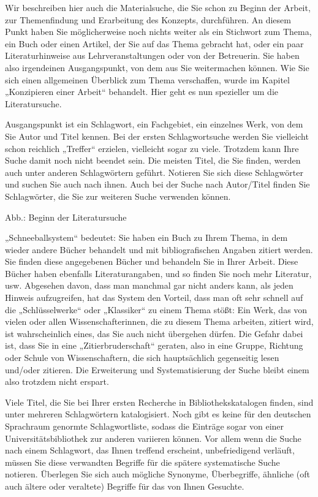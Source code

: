 \documentclass[]{book}
\theoremstyle{definition}
\theoremstyle{definition}
\theoremstyle{definition}
\theoremstyle{remark}
\begin{document}
Wir beschreiben hier auch die Materialsuche, die Sie schon zu Beginn der
Arbeit, zur Themenfindung und Erarbeitung des Konzepts, durchführen. An
diesem Punkt haben Sie möglicherweise noch nichts weiter als ein
Stichwort zum Thema, ein Buch oder einen Artikel, der Sie auf das Thema
gebracht hat, oder ein paar Literaturhinweise aus Lehrveranstaltungen
oder von der Betreuerin. Sie haben also irgendeinen Ausgangspunkt, von
dem aus Sie weitermachen können. Wie Sie sich einen allgemeinen
Überblick zum Thema verschaffen, wurde im Kapitel „Konzipieren einer
Arbeit`` behandelt. Hier geht es nun spezieller um die Literatursuche.

Ausgangspunkt ist ein Schlagwort, ein Fachgebiet, ein einzelnes Werk,
von dem Sie Autor und Titel kennen. Bei der ersten Schlagwortsuche
werden Sie vielleicht schon reichlich „Treffer`` erzielen, vielleicht
sogar zu viele. Trotzdem kann Ihre Suche damit noch nicht beendet sein.
Die meisten Titel, die Sie finden, werden auch unter anderen
Schlagwörtern geführt. Notieren Sie sich diese Schlagwörter und suchen
Sie auch nach ihnen. Auch bei der Suche nach Autor/Titel finden Sie
Schlagwörter, die Sie zur weiteren Suche verwenden können.

Abb.: Beginn der Literatursuche

„Schneeballsystem`` bedeutet: Sie haben ein Buch zu Ihrem Thema, in dem
wieder andere Bücher behandelt und mit bibliografischen Angaben zitiert
werden. Sie finden diese angegebenen Bücher und behandeln Sie in Ihrer
Arbeit. Diese Bücher haben ebenfalls Literaturangaben, und so finden Sie
noch mehr Literatur, usw. Abgesehen davon, dass man manchmal gar nicht
anders kann, als jeden Hinweis aufzugreifen, hat das System den Vorteil,
dass man oft sehr schnell auf die „Schlüsselwerke`` oder „Klassiker`` zu
einem Thema stößt: Ein Werk, das von vielen oder allen
Wissenschafterinnen, die zu diesem Thema arbeiten, zitiert wird, ist
wahrscheinlich eines, das Sie auch nicht übergehen dürfen. Die Gefahr
dabei ist, dass Sie in eine „Zitierbruderschaft`` geraten, also in eine
Gruppe, Richtung oder Schule von Wissenschaftern, die sich hauptsächlich
gegenseitig lesen und/oder zitieren. Die Erweiterung und
Systematisierung der Suche bleibt einem also trotzdem nicht erspart.

Viele Titel, die Sie bei Ihrer ersten Recherche in Bibliothekskatalogen
finden, sind unter mehreren Schlagwörtern katalogisiert. Noch gibt es
keine für den deutschen Sprachraum genormte Schlagwortliste, sodass die
Einträge sogar von einer Universitätsbibliothek zur anderen variieren
können. Vor allem wenn die Suche nach einem Schlagwort, das Ihnen
treffend erscheint, unbefriedigend verläuft, müssen Sie diese verwandten
Begriffe für die spätere systematische Suche notieren. Überlegen Sie
sich auch mögliche Synonyme, Überbegriffe, ähnliche (oft auch ältere
oder veraltete) Begriffe für das von Ihnen Gesuchte.
\end{document}
